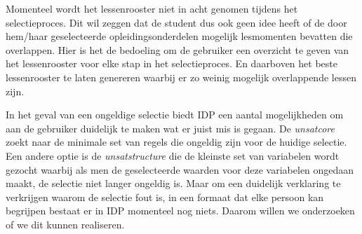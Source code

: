 Momenteel wordt het lessenrooster niet in acht genomen tijdens het selectieproces. Dit wil zeggen dat de student dus ook geen idee heeft of de door hem/haar geselecteerde opleidingsonderdelen mogelijk lesmomenten bevatten die overlappen. Hier is het de bedoeling om de gebruiker een overzicht te geven van het lessenrooster voor elke stap in het selectieproces. En daarboven het beste lessenrooster te laten genereren waarbij er zo weinig mogelijk overlappende lessen zijn.

In het geval van een ongeldige selectie biedt IDP een aantal mogelijkheden om aan de gebruiker duidelijk te maken wat er juist mis is gegaan. De \emph{unsatcore} zoekt naar de minimale set van regels die ongeldig zijn voor de huidige selectie. Een andere optie is de \emph{unsatstructure} die de kleinste set van variabelen wordt gezocht waarbij als men de geselecteerde waarden voor deze variabelen ongedaan maakt, de selectie niet langer ongeldig is. Maar om een duidelijk verklaring te verkrijgen waarom de selectie fout is, in een formaat dat elke persoon kan begrijpen bestaat er in IDP momenteel nog niets. Daarom willen we onderzoeken of we dit kunnen realiseren.


